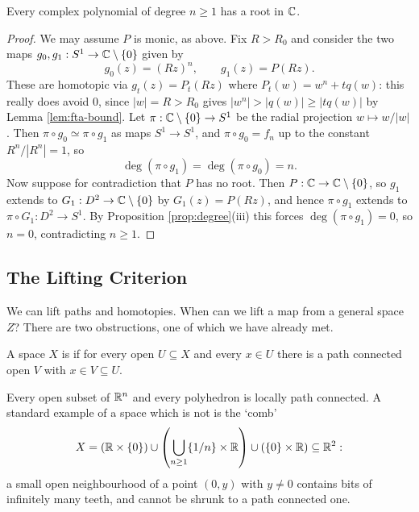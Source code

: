\documentclass[a4paper]{scrartcl}
\begin{document}
\begin{theorem}
	Every complex polynomial of degree $n \geq 1$ has a root in $\mathbb{C}$.
\end{theorem}
\begin{proof}
	We may assume $P$ is monic, as above. Fix $R > R_0$ and consider the two maps $g_0, g_1: S^1 \to \mathbb{C} \setminus \{0\}$ given by
	$$
	g_0(z) = (Rz)^n, \qquad g_1(z) = P(Rz).
	$$
	These are homotopic via $g_t(z) = P_t(Rz)$ where $P_t(w) = w^n + t q(w)$: this really does avoid $0$, since $|w| = R > R_0$ gives $|w^n| > |q(w)| \geq |tq(w)|$ by Lemma \ref{lem:fta-bound}. Let $\pi: \mathbb{C} \setminus \{0\} \to S^1$ be the radial projection $w \mapsto w/|w|$. Then $\pi \circ g_0 \simeq \pi \circ g_1$ as maps $S^1 \to S^1$, and $\pi \circ g_0 = f_n$ up to the constant $R^n/|R^n|=1$, so
	$$
	\deg(\pi \circ g_1) = \deg (\pi \circ g_0) = n.
	$$
	Now suppose for contradiction that $P$ has no root. Then $P: \mathbb{C} \to \mathbb{C}\setminus\{0\}$, so $g_1$ extends to $G_1: D^2 \to \mathbb{C} \setminus \{0\}$ by $G_1(z) = P(Rz)$, and hence $\pi \circ g_1$ extends to $\pi \circ G_1: D^2 \to S^1$. By Proposition \ref{prop:degree}(iii) this forces $\deg (\pi\circ g_1) = 0$, so $n = 0$, contradicting $n \geq 1$.
\end{proof}

\subsection{The Lifting Criterion}

We can lift paths and homotopies. When can we lift a map from a general space $Z$? There
are two obstructions, one of which we have already met.

\begin{definition}
	A space $X$ is  if for every open $U \subseteq X$ and every $x \in U$ there is a path connected open $V$ with $x \in V \subseteq U$.
\end{definition}

\begin{example}
	Every open subset of $\mathbb{R}^n$ and every polyhedron is locally path connected. A standard example of a space which is not is the `comb'
	$$
	X = (\mathbb{R} \times \{0\}) \cup \left(\bigcup_{n \geq 1}\{1/n\} \times \mathbb{R}\right) \cup (\{0\}\times \mathbb{R}) \subseteq \mathbb{R}^2:
	$$
	a small open neighbourhood of a point $(0,y)$ with $y \neq 0$ contains bits of infinitely many teeth, and cannot be shrunk to a path connected one.
\end{example}
\end{document}
